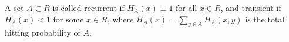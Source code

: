 A set \(A \subset R\) is called recurrent if \(H_A(x) \equiv 1\) for all \(x \in R\), and transient if \(H_A(x) < 1\) for some \(x \in R\), where \(H_A(x) = \sum_{y \in A} H_A(x,y)\) is the total hitting probability of \(A\).
